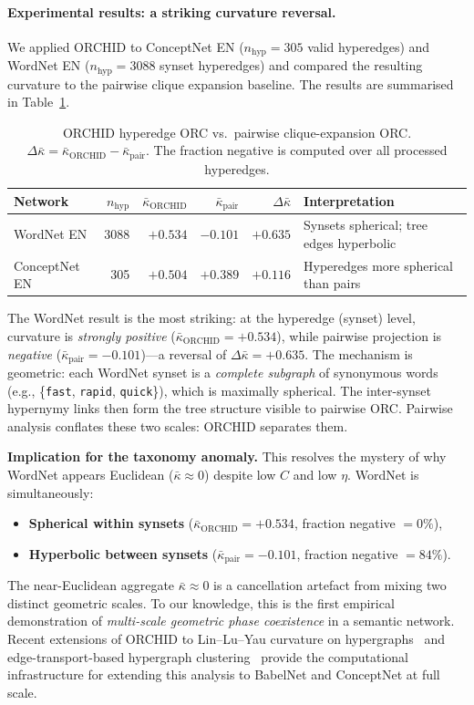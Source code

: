 \documentclass[11pt,a4paper]{article}
\newcommand{\kbar}{\bar{\kappa}}
\begin{document}
\paragraph{Experimental results: a striking curvature reversal.}
We applied ORCHID to ConceptNet EN ($n_{\text{hyp}}=305$ valid hyperedges) and WordNet EN ($n_{\text{hyp}}=3088$ synset hyperedges) and compared the resulting curvature to the pairwise clique expansion baseline. The results are summarised in Table~\ref{tab:orchid_results}.

\begin{table}[h]
\centering
\small
\caption{ORCHID hyperedge ORC vs.\ pairwise clique-expansion ORC. $\Delta\kbar = \kbar_{\text{ORCHID}} - \kbar_{\text{pair}}$. The fraction negative is computed over all processed hyperedges.}
\label{tab:orchid_results}
\begin{tabular}{@{}lrrrrl@{}}
\toprule
Network & $n_{\text{hyp}}$ & $\kbar_{\text{ORCHID}}$ & $\kbar_{\text{pair}}$ & $\Delta\kbar$ & Interpretation \\
\midrule
WordNet EN    & 3088 & $+0.534$ & $-0.101$ & $\mathbf{+0.635}$ & Synsets spherical; tree edges hyperbolic \\
ConceptNet EN &  305 & $+0.504$ & $+0.389$ & $+0.116$          & Hyperedges more spherical than pairs \\
\bottomrule
\end{tabular}
\end{table}

The WordNet result is the most striking: at the hyperedge (synset) level, curvature is \emph{strongly positive} ($\kbar_{\text{ORCHID}}=+0.534$), while pairwise projection is \emph{negative} ($\kbar_{\text{pair}}=-0.101$)---a reversal of $\Delta\kbar = +0.635$. The mechanism is geometric: each WordNet synset is a \emph{complete subgraph} of synonymous words (e.g., \{\texttt{fast}, \texttt{rapid}, \texttt{quick}\}), which is maximally spherical. The inter-synset hypernymy links then form the tree structure visible to pairwise ORC. Pairwise analysis conflates these two scales: ORCHID separates them.

\textbf{Implication for the taxonomy anomaly.} This resolves the mystery of why WordNet appears Euclidean ($\kbar \approx 0$) despite low $C$ and low $\eta$. WordNet is simultaneously:
\begin{itemize}
  \item \textbf{Spherical within synsets} ($\kbar_{\text{ORCHID}} = +0.534$, fraction negative $= 0\%$),
  \item \textbf{Hyperbolic between synsets} ($\kbar_{\text{pair}} = -0.101$, fraction negative $= 84\%$).
\end{itemize}
The near-Euclidean aggregate $\kbar \approx 0$ is a cancellation artefact from mixing two distinct geometric scales. To our knowledge, this is the first empirical demonstration of \emph{multi-scale geometric phase coexistence} in a semantic network.
Recent extensions of ORCHID to Lin--Lu--Yau curvature on hypergraphs~\cite{lly2025hypergraph} and edge-transport-based hypergraph clustering~\cite{coupette2025hypergraph} provide the computational infrastructure for extending this analysis to BabelNet and ConceptNet at full scale.
\end{document}
